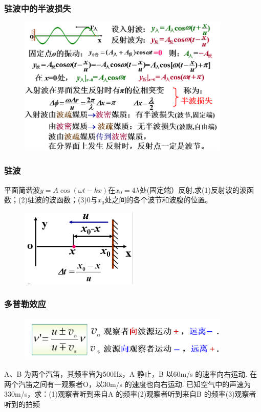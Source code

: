 \documentclass[UTF8]{ctexbeamer}
\begin{document}
\begin{frame}
\frametitle{驻波中的半波损失}
		\begin{figure}[!ht]
	\centering
	\includegraphics[width=0.9\textwidth]{9}
\end{figure}
\end{frame}
\begin{frame}
\frametitle{驻波}
\begin{examples}
	平面简谐波$y=A\cos(\omega t-kx)$在$x_0=4\lambda$处(固定端）反射,求(1)反射波的波函数；(2)驻波的波函数；(3)0与$x_0$处之间的各个波节和波腹的位置。
			\begin{figure}[!ht]
		\centering
		\includegraphics[width=0.5\textwidth]{10}
	\end{figure}
\end{examples}
\end{frame}
\begin{frame}
	\frametitle{多普勒效应}
				\begin{figure}[!ht]
		\centering
		\includegraphics[width=0.9\textwidth]{11}
	\end{figure}
	\begin{examples}
		A、B 为两个汽笛，其频率皆为500Hz，A 静止，B 以60m/s 的速率向右运动. 在两个汽笛之间有一观察者O，以30m/s 的速度也向右运动. 已知空气中的声速为330m/s，求：(1)观察者听到来自A 的频率(2)观察者听到来自B 的频率(3)观察者听到的拍频
	\end{examples}
\end{frame}
\end{document}
